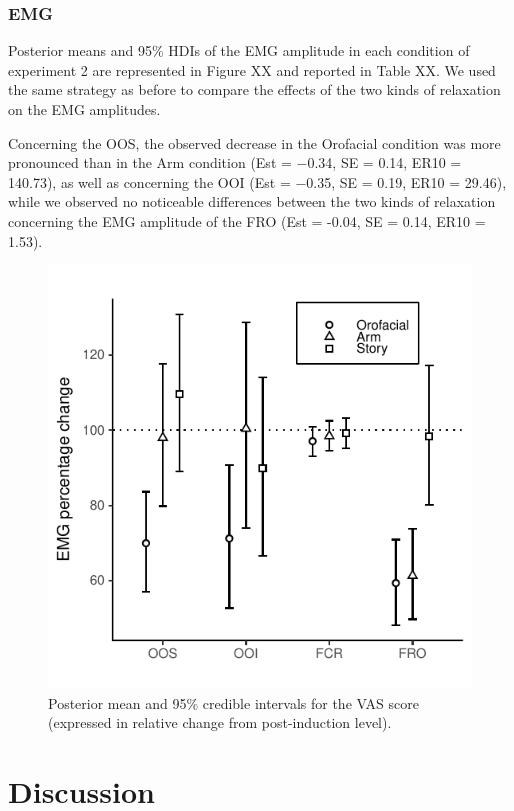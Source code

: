 \documentclass[a4paper,12pt,twoside,openright,oldfontcommands]{memoir}
\begin{document}
\hypertarget{emg-1}{%
\subsubsection{EMG}\label{emg-1}}

Posterior means and 95\% HDIs of the EMG amplitude in each condition of experiment 2 are represented in Figure XX and reported in Table XX. We used the same strategy as before to compare the effects of the two kinds of relaxation on the EMG amplitudes.

Concerning the OOS, the observed decrease in the Orofacial condition was more pronounced than in the Arm condition (Est = −0.34, SE = 0.14, ER10 = 140.73), as well as concerning the OOI (Est = −0.35, SE = 0.19, ER10 = 29.46), while we observed no noticeable differences between the two kinds of relaxation concerning the EMG amplitude of the FRO (Est = -0.04, SE = 0.14, ER10 = 1.53).

\begin{figure}[H]

{\centering \includegraphics[width=0.75\linewidth]{assets/emg_fig3} 

}

\caption{Posterior mean and 95\% credible intervals for the VAS score (expressed in relative change from post-induction level).}\label{fig:resultsemgfig3}
\end{figure}

\hypertarget{discussion}{%
\section{Discussion}\label{discussion}}
\end{document}
